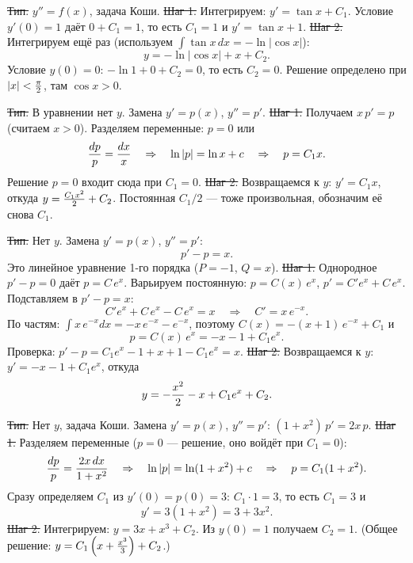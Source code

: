 \st{Тип.} $y''=f(x)$, задача Коши.
\st{Шаг 1.} Интегрируем: $y'=\tan x+C_1$. Условие $y'(0)=1$ даёт
$0+C_1=1$, то есть $C_1=1$ и $y'=\tan x+1$.
\st{Шаг 2.} Интегрируем ещё раз (используем $\int\tan x\,dx=-\ln|\cos x|$):
$$y=-\ln|\cos x|+x+C_2.$$
Условие $y(0)=0$: $-\ln1+0+C_2=0$, то есть $C_2=0$.
\smallskip
Решение определено при $|x|<{\pi\over2}$, там $\cos x>0$.

\st{Тип.} В уравнении нет $y$. Замена $y'=p(x)$, $y''=p'$.
\st{Шаг 1.} Получаем $x\,p'=p$ (считаем $x>0$). Разделяем переменные:
$p=0$ или
$${dp\over p}={dx\over x}\quad\Rightarrow\quad\ln|p|=\ln x+c
\quad\Rightarrow\quad p=C_1x.$$
Решение $p=0$ входит сюда при $C_1=0$.
\st{Шаг 2.} Возвращаемся к $y$: $y'=C_1x$, откуда
$y={C_1x^2\over2}+C_2$. Постоянная $C_1/2$ --- тоже произвольная, обозначим
её снова $C_1$.

\st{Тип.} Нет $y$. Замена $y'=p(x)$, $y''=p'$:
$$p'-p=x.$$
Это линейное уравнение 1-го порядка ($P=-1$, $Q=x$).
\st{Шаг 1.} Однородное $p'-p=0$ даёт $p=C\,e^{x}$. Варьируем постоянную:
$p=C(x)\,e^{x}$, $p'=C'e^x+C\,e^x$. Подставляем в $p'-p=x$:
$$C'e^{x}+C\,e^x-C\,e^x=x\quad\Rightarrow\quad C'=x\,e^{-x}.$$
По частям: $\int x\,e^{-x}dx=-x\,e^{-x}-e^{-x}$, поэтому
$C(x)=-(x+1)\,e^{-x}+C_1$ и
$$p=C(x)\,e^{x}=-x-1+C_1e^{x}.$$
Проверка: $p'-p=C_1e^x-1+x+1-C_1e^x=x$.
\st{Шаг 2.} Возвращаемся к $y$: $y'=-x-1+C_1e^x$, откуда
$$y=-{x^2\over2}-x+C_1e^{x}+C_2.$$

\st{Тип.} Нет $y$, задача Коши. Замена $y'=p(x)$, $y''=p'$:
$(1+x^2)\,p'=2x\,p$.
\st{Шаг 1.} Разделяем переменные ($p=0$ --- решение, оно войдёт при
$C_1=0$):
$${dp\over p}={2x\,dx\over1+x^2}\quad\Rightarrow\quad
\ln|p|=\ln(1+x^2)+c\quad\Rightarrow\quad p=C_1(1+x^2).$$
Сразу определяем $C_1$ из $y'(0)=p(0)=3$: $C_1\cdot1=3$, то есть $C_1=3$ и
$$y'=3(1+x^2)=3+3x^2.$$
\st{Шаг 2.} Интегрируем: $y=3x+x^3+C_2$. Из $y(0)=1$ получаем $C_2=1$.
\smallskip
(Общее решение: $y=C_1\left(x+{x^3\over3}\right)+C_2$.)

